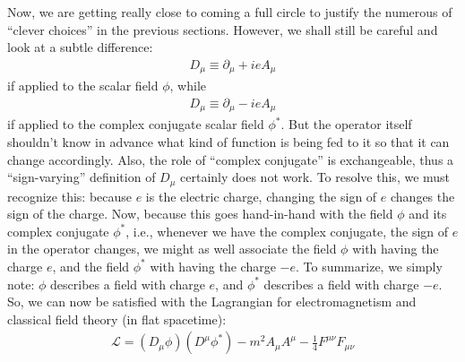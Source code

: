 \documentclass{book}
\numberwithin{equation}{section}
\theoremstyle{definition}
\newcommand{\p}{\partial}
\newcommand{\lag}{\mathcal{L}}
\begin{document}
Now, we are getting really close to coming a full circle to justify the numerous of ``clever choices'' in the previous sections. However, we shall still be careful and look at a subtle difference:
\begin{align}
D_\mu \equiv \p_\mu + ieA_\mu
\end{align}
if applied to the scalar field $\phi$, while 
\begin{align}
D_\mu \equiv \p_\mu -ieA_\mu
\end{align}
if applied to the complex conjugate scalar field $\phi^*$. But the operator itself shouldn't know in advance what kind of function is being fed to it so that it can change accordingly. Also, the role of ``complex conjugate'' is exchangeable, thus a ``sign-varying'' definition of $D_\mu$ certainly does not work. To resolve this, we must recognize this: because $e$ is the electric charge, changing the sign of $e$ changes the sign of the charge. Now, because this goes hand-in-hand with the field $\phi$ and its complex conjugate $\phi^*$, i.e., whenever we have the complex conjugate, the sign of $e$ in the operator changes, we might as well associate the field $\phi$ with having the charge $e$, and the field $\phi^*$ with having the charge $-e$. To summarize, we simply note: $\phi$ describes a field with charge $e$, and $\phi^*$ describes a field with charge $-e$. So, we can now be satisfied with the Lagrangian for electromagnetism and classical field theory (in flat spacetime):
\begin{align}
\boxed{ \lag = (D_\mu\phi)(D^\mu\phi^*) - m^2 A_\mu A^\mu - \frac{1}{4}F^{\mu\nu}F_{\mu\nu}}
\end{align}
\end{document}
